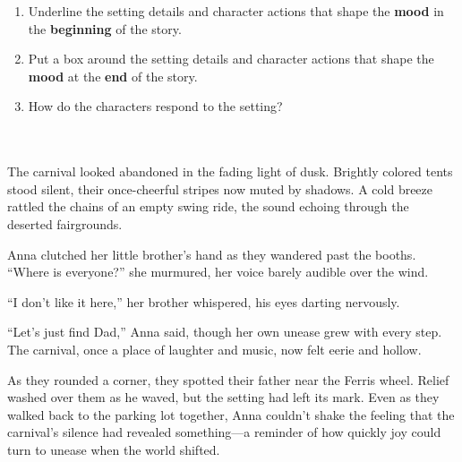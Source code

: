 \documentclass[12pt]{article}
\begin{document}
\vspace{1em}
\begin{tcolorbox}[colframe=black!60, colback=white, 
coltitle=black, colbacktitle=black!15, fonttitle=\bfseries\Large, 
title=Guided Practice, halign title=center, left=10pt, right=10pt, top=10pt, bottom=15pt]

\begin{enumerate}[itemsep=1em]

    \item Underline the setting details and character actions that shape the \textbf{mood} in the \textbf{beginning} of the story.
    \item Put a box around the setting details and character actions that shape the \textbf{mood }at the \textbf{end} of the story.
    \item How do the characters respond to the setting?
    \\[0.8cm] \underline{\hspace{14cm}}  
    \\[0.8cm] \underline{\hspace{14cm}}  
    \\[0.8cm] \underline{\hspace{14cm}} 
\end{enumerate}
\end{tcolorbox}

\vspace{1em}

\begin{tcolorbox}[colframe=black!60, colback=white, 
coltitle=black, colbacktitle=black!15, fonttitle=\bfseries\Large, 
title=Text: The Empty Carnival, halign title=center, left=10pt, right=10pt, top=10pt, bottom=15pt]

The carnival looked abandoned in the fading light of dusk. Brightly colored tents stood silent, their once-cheerful stripes now muted by shadows. A cold breeze rattled the chains of an empty swing ride, the sound echoing through the deserted fairgrounds. 

Anna clutched her little brother’s hand as they wandered past the booths. “Where is everyone?” she murmured, her voice barely audible over the wind.

“I don’t like it here,” her brother whispered, his eyes darting nervously. 

“Let’s just find Dad,” Anna said, though her own unease grew with every step. The carnival, once a place of laughter and music, now felt eerie and hollow.

As they rounded a corner, they spotted their father near the Ferris wheel. Relief washed over them as he waved, but the setting had left its mark. Even as they walked back to the parking lot together, Anna couldn’t shake the feeling that the carnival’s silence had revealed something—a reminder of how quickly joy could turn to unease when the world shifted.

\end{tcolorbox}
\end{document}
